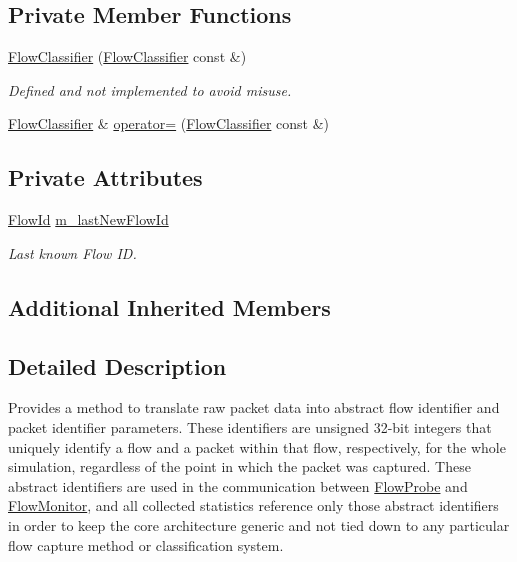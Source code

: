 \subsection*{Private Member Functions}
\begin{DoxyCompactItemize}
\item 
\hyperlink{classns3_1_1FlowClassifier_ad09a1b3485dfdc6aab39c3f6a38eb2dc}{Flow\+Classifier} (\hyperlink{classns3_1_1FlowClassifier}{Flow\+Classifier} const \&)
\begin{DoxyCompactList}\small\item\em Defined and not implemented to avoid misuse. \end{DoxyCompactList}\item 
\hyperlink{classns3_1_1FlowClassifier}{Flow\+Classifier} \& \hyperlink{classns3_1_1FlowClassifier_a8661e36034570feed37048b7337642d9}{operator=} (\hyperlink{classns3_1_1FlowClassifier}{Flow\+Classifier} const \&)
\end{DoxyCompactItemize}
\subsection*{Private Attributes}
\begin{DoxyCompactItemize}
\item 
\hyperlink{group__flow-monitor_ga39a766c4a370cdb9ab8ac85da4b288e9}{Flow\+Id} \hyperlink{classns3_1_1FlowClassifier_acb5af676658bcb9844cb5aaa89a99841}{m\+\_\+last\+New\+Flow\+Id}
\begin{DoxyCompactList}\small\item\em Last known Flow ID. \end{DoxyCompactList}\end{DoxyCompactItemize}
\subsection*{Additional Inherited Members}


\subsection{Detailed Description}
Provides a method to translate raw packet data into abstract {\ttfamily flow identifier} and {\ttfamily packet identifier} parameters. These identifiers are unsigned 32-\/bit integers that uniquely identify a flow and a packet within that flow, respectively, for the whole simulation, regardless of the point in which the packet was captured. These abstract identifiers are used in the communication between \hyperlink{classns3_1_1FlowProbe}{Flow\+Probe} and \hyperlink{classns3_1_1FlowMonitor}{Flow\+Monitor}, and all collected statistics reference only those abstract identifiers in order to keep the core architecture generic and not tied down to any particular flow capture method or classification system. 

